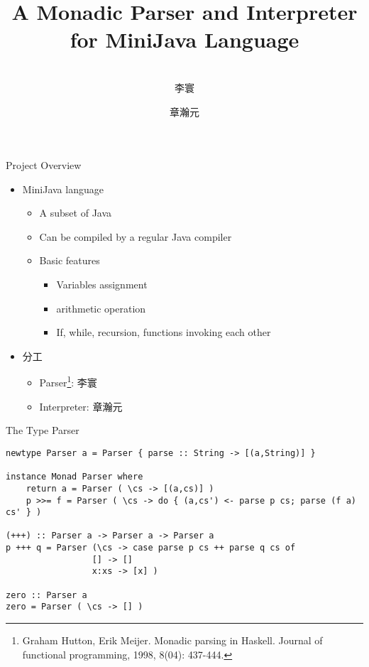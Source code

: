 \documentclass[12pt]{beamer}
\title{A Monadic Parser and Interpreter for MiniJava Language}
\author{\quad\\ 李寰\inst{1} \and 章瀚元\inst{2}}
\date{} %
\institute{
	\inst{1}
	16210240012@fudan.edu.cn
	\and
	\inst{2}
	16210240024@fudan.edu.cn
}
\newcommand{\codesize}{\fontsize{7.7}{7.7}}
\begin{document}
\begin{spacing}{1.3}

\begin{frame}
	\titlepage
\end{frame}

\begin{frame}{Project Overview}
\begin{itemize}
\item MiniJava language
	\begin{itemize}
		\item A subset of Java
		\item Can be compiled by a regular Java compiler
		\item Basic features
			\begin{itemize}
				\item Variables assignment
				\item arithmetic operation
				\item If, while, recursion, functions invoking each other
			\end{itemize}
	\end{itemize}
\item 分工
	\begin{itemize}
	\item Parser\footnote[frame]{Graham Hutton, Erik Meijer. Monadic parsing in Haskell. Journal of functional programming, 1998, 8(04): 437-444.\vspace{1pt}}: 李寰
	\item Interpreter: 章瀚元
	\end{itemize}
\end{itemize}
\end{frame}

\begin{frame}[fragile=singleslide]{The Type Parser}

\begin{verbatim}
newtype Parser a = Parser { parse :: String -> [(a,String)] }

instance Monad Parser where
    return a = Parser ( \cs -> [(a,cs)] )
    p >>= f = Parser ( \cs -> do { (a,cs') <- parse p cs; parse (f a) cs' } )

(+++) :: Parser a -> Parser a -> Parser a
p +++ q = Parser (\cs -> case parse p cs ++ parse q cs of
                 [] -> []
                 x:xs -> [x] )

zero :: Parser a
zero = Parser ( \cs -> [] )
\end{verbatim}
\end{frame}


\end{spacing}
\end{document}
